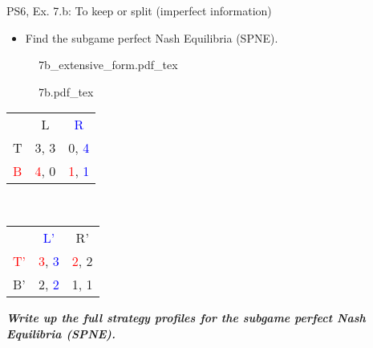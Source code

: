\begin{frame}{PS6, Ex. 7.b: To keep or split (imperfect information)}
  \begin{itemize}
    \item[(b)] Find the subgame perfect Nash Equilibria (SPNE).
  \end{itemize}
  \vspace{-4pt}
  \begin{figure}[!h]
    \center
    \def\svgwidth{.8\columnwidth}
    {7b_extensive_form.pdf_tex}
  \end{figure}
  \vspace{-2pt}
  \begin{multicols}{2}
    \begin{figure}[!h]
      \center
      \def\svgwidth{.5\columnwidth}
      {7b.pdf_tex}
    \end{figure}
    \vspace{-8pt}
    \begin{table}
      \begin{tabular}{l|c|c|}
        \multicolumn{1}{c}{} & \multicolumn{1}{c}{L} & \multicolumn{1}{c}{\textcolor{blue}{R}} \\\cline{2-3}
        T & 3, 3 & 0, \textcolor{blue}{4} \\\cline{2-3}
        \textcolor{red}{B} & \textcolor{red}{4}, 0 & \textcolor{red}{1}, \textcolor{blue}{1} \\\cline{2-3}
        \end{tabular}\
        \begin{tabular}{l|c|c|}
          \multicolumn{1}{c}{} & \multicolumn{1}{c}{\textcolor{blue}{L'}} & \multicolumn{1}{c}{R'} \\\cline{2-3}
          \textcolor{red}{T'} & \textcolor{red}{3}, \textcolor{blue}{3} & \textcolor{red}{2}, 2 \\\cline{2-3}
          B' & 2, \textcolor{blue}{2} & 1, 1 \\\cline{2-3}
        \end{tabular}
    \end{table}
  \vfill\null\columnbreak
  \vfill\null
  \textbf{\textit{Write up the full strategy profiles for the subgame perfect Nash Equilibria (SPNE).}}
  \end{multicols}
\end{frame}
